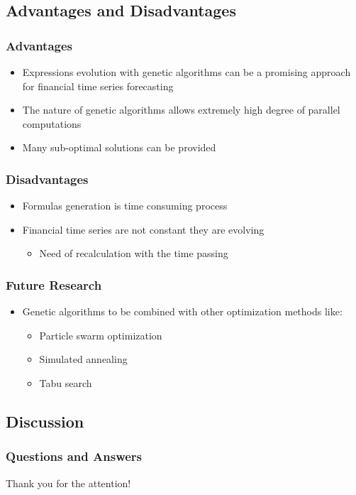 \documentclass{beamer}
\begin{document}
\subsection{Advantages and Disadvantages}

\begin{frame}
\frametitle{Advantages}
\begin{itemize}
	\item Expressions evolution with genetic algorithms can be a promising approach for financial time series forecasting
	\item The nature of genetic algorithms allows extremely high degree of parallel computations
	\item Many sub-optimal solutions can be provided
\end{itemize}
\end{frame}

\begin{frame}
\frametitle{Disadvantages}
\begin{itemize}
	\item Formulas generation is time consuming process
	\item Financial time series are not constant they are evolving
	\begin{itemize}
		\item Need of recalculation with the time passing
	\end{itemize}
\end{itemize}
\end{frame}

\begin{frame}
\frametitle{Future Research}
\begin{itemize}
	\item Genetic algorithms to be combined with other optimization methods like:
	\begin{itemize}
		\item Particle swarm optimization
		\item Simulated annealing
		\item Tabu search
	\end{itemize}
\end{itemize}
\end{frame}

\subsection{Discussion}

\begin{frame}
\frametitle{Questions and Answers}
\center \huge{Thank you for the attention!}
\end{frame}
\end{document}

